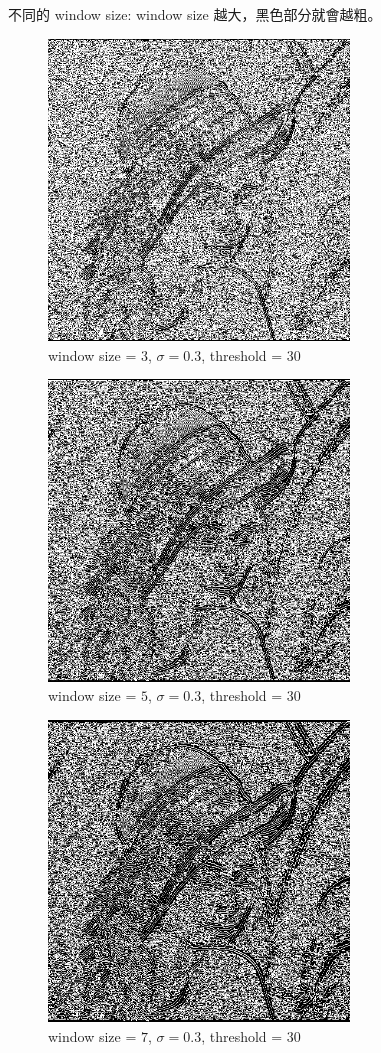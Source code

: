 \documentclass[conference]{IEEEtran}
\begin{document}
不同的 window size: window size 越大，黑色部分就會越粗。

\begin{figure}[H]
\centerline{\includegraphics[width=8cm]{lena01.png}}
\caption{window size = $3$, $\sigma=0.3$,  threshold = $30$}
\label{lena01}
\end{figure}

\begin{figure}[H]
\centerline{\includegraphics[width=8cm]{lena02.png}}
\caption{window size = $5$, $\sigma=0.3$,  threshold = $30$}
\label{lena02}
\end{figure}

\begin{figure}[H]
\centerline{\includegraphics[width=8cm]{lena03.png}}
\caption{window size = $7$, $\sigma=0.3$,  threshold = $30$}
\label{lena03}
\end{figure}
\end{document}
